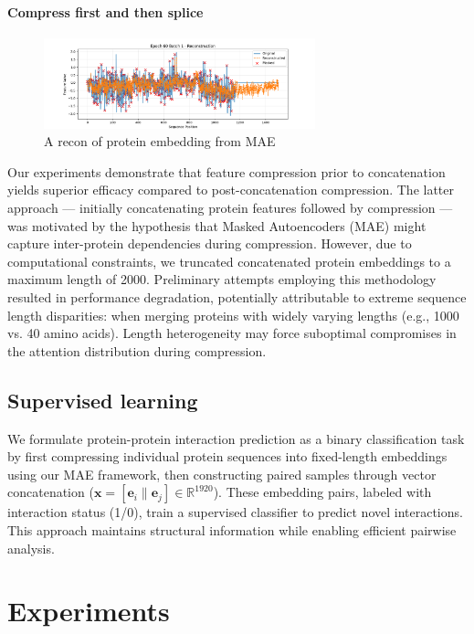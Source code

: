 \documentclass{article}
\begin{document}
	\paragraph{Compress first and then splice} 
	
	\begin{figure}[h]
		\centering
		\includegraphics[width=0.7\textwidth]{imgs/epoch60_batch1.png}
		\caption{A recon of protein embedding from MAE}
	\end{figure}
	
 Our experiments demonstrate that {feature compression prior to concatenation yields superior efficacy} compared to post-concatenation compression. The latter approach — initially concatenating protein features followed by compression — was motivated by the hypothesis that Masked Autoencoders (MAE) might capture inter-protein dependencies during compression. However, due to computational constraints, we truncated concatenated protein embeddings to a maximum length of 2000. Preliminary attempts employing this methodology resulted in performance degradation, potentially attributable to extreme sequence length disparities: when merging proteins with widely varying lengths (e.g., 1000 vs. 40 amino acids). Length heterogeneity may force suboptimal compromises in the attention distribution during compression.  
	
	
	\subsection{Supervised learning}

 We formulate protein-protein interaction prediction as a binary classification task by first compressing individual protein sequences into fixed-length embeddings using our MAE framework, then constructing paired samples through vector concatenation ($\mathbf{x} = [\mathbf{e}_i \|\mathbf{e}_j] \in \mathbb{R}^{1920}$). These embedding pairs, labeled with interaction status (1/0), train a supervised classifier to predict novel interactions. This approach maintains structural information while enabling efficient pairwise analysis.
	
	\section{Experiments}
    
\end{document}
